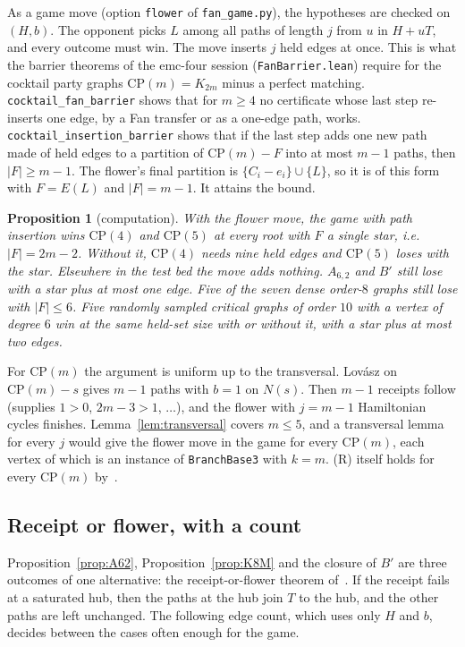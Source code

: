 \documentclass[11pt]{amsart}
\newtheorem{proposition}[theorem]{Proposition}
\theoremstyle{definition}
\begin{document}
As a game move (option \texttt{flower} of \texttt{fan\_game.py}), the hypotheses are checked on
$(H,b)$. The opponent picks $L$ among all paths of length $j$ from $u$ in $H+uT$, and every
outcome must win. The move inserts $j$ held edges at once. This is what the barrier theorems of
the emc-four session (\texttt{FanBarrier.lean}) require for the cocktail party graphs
$\mathrm{CP}(m)=K_{2m}$ minus a perfect matching. \texttt{cocktail\_fan\_barrier} shows that for
$m\ge4$ no certificate whose last step re-inserts one edge, by a Fan transfer or as a one-edge path,
works. \texttt{cocktail\_insertion\_barrier} shows that if the last step adds one new path made of
held edges to a partition of $\mathrm{CP}(m)-F$ into at most $m-1$ paths, then $|F|\ge m-1$. The
flower's final partition is $\{C_i-e_i\}\cup\{L\}$, so it is of this form with $F=E(L)$ and
$|F|=m-1$. It attains the bound.

\begin{proposition}[computation]\label{prop:flowergame}
With the flower move, the game with path insertion wins $\mathrm{CP}(4)$ and $\mathrm{CP}(5)$ at
every root with $F$ a single star, i.e.\ $|F|=2m-2$. Without it, $\mathrm{CP}(4)$ needs nine held
edges and $\mathrm{CP}(5)$ loses with the star. Elsewhere in the test bed the move adds nothing.
$A_{6,2}$ and $B'$ still lose with a star plus at most one edge. Five of the seven dense order-$8$
graphs still lose with $|F|\le6$. Five randomly sampled critical graphs of order $10$ with a vertex
of degree $6$ win at the same held-set size with or without it, with a star plus at most two
edges.
\end{proposition}
For $\mathrm{CP}(m)$ the argument is uniform up to the transversal. Lov\'asz on $\mathrm{CP}(m)-s$
gives $m-1$ paths with $b=1$ on $N(s)$. Then $m-1$ receipts follow (supplies $1>0$, $2m-3>1$,
$\dots$), and the flower with $j=m-1$ Hamiltonian cycles finishes. Lemma~\ref{lem:transversal}
covers $m\le5$, and a transversal lemma for every $j$ would give the flower move in the game for
every $\mathrm{CP}(m)$, each vertex of which is an instance of \texttt{BranchBase3} with $k=m$.
(R) itself holds for every $\mathrm{CP}(m)$ by~\cite[Thm.~10.21]{SP}.

\subsection*{Receipt or flower, with a count}
Proposition~\ref{prop:A62}, Proposition~\ref{prop:K8M} and the closure of $B'$ are three outcomes
of one alternative: the receipt-or-flower theorem of~\cite[Thm.~67]{ES}. If the receipt fails at a
saturated hub, then the paths at the hub join $T$ to the hub, and the other paths are left
unchanged. The following edge count, which uses only $H$ and $b$, decides between the cases often
enough for the game.
\end{document}
